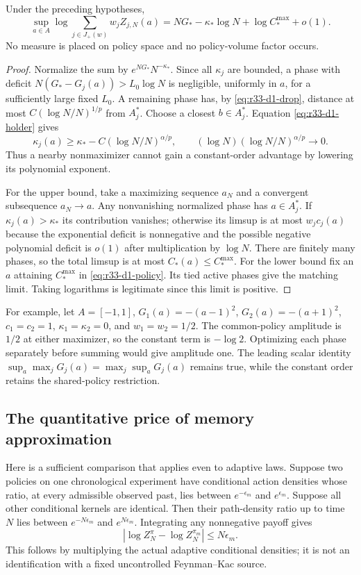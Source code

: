 \begin{theorem}
\label{thm:r33-d1-selection}
Under the preceding hypotheses,
\[
 \sup_{a\in A}\log\sum_{j\in J_+(w)}w_jZ_{j,N}(a)
 =NG_* -\kappa_*\log N+\log C_*^{\max}+o(1).
\]
No measure is placed on policy space and no policy-volume factor occurs.
\end{theorem}
\begin{proof}
Normalize the sum by $e^{NG_*}N^{-\kappa_*}$.  Since all $\kappa_j$ are
bounded, a phase with deficit $N(G_*-G_j(a))>L_0\log N$ is negligible,
uniformly in $a$, for a sufficiently large fixed $L_0$.
A remaining phase has, by \eqref{eq:r33-d1-drop}, distance at most
$C(\log N/N)^{1/p}$ from $A_j^*$.  Choose a closest $b\in A_j^*$.
Equation \eqref{eq:r33-d1-holder} gives
\[
 \kappa_j(a)\ge\kappa_*-
 C(\log N/N)^{\alpha/p},\qquad
 (\log N)(\log N/N)^{\alpha/p}\longrightarrow0.
\]
Thus a nearby nonmaximizer cannot gain a constant-order advantage by lowering
its polynomial exponent.

For the upper bound, take a maximizing sequence $a_N$ and a convergent
subsequence $a_N\to a$.  Any nonvanishing normalized phase has $a\in A_j^*$.
If $\kappa_j(a)>\kappa_*$ its contribution vanishes; otherwise its limsup
is at most $w_jc_j(a)$ because the exponential deficit is nonnegative and
the possible negative polynomial deficit is $o(1)$ after multiplication by
$\log N$.  There are finitely many phases, so the total limsup is at most
$C_*(a)\le C_*^{\max}$.
For the lower bound fix an $a$ attaining $C_*^{\max}$ in
\eqref{eq:r33-d1-policy}.  Its tied active phases give the matching limit.
Taking logarithms is legitimate since this limit is positive.
\end{proof}

For example, let $A=[-1,1]$, $G_1(a)=-(a-1)^2$,
$G_2(a)=-(a+1)^2$, $c_1=c_2=1$, $\kappa_1=\kappa_2=0$, and
$w_1=w_2=1/2$.  The common-policy amplitude is $1/2$ at either maximizer,
so the constant term is $-\log2$.  Optimizing each phase separately before
summing would give amplitude one.  The leading scalar identity
$\sup_a\max_jG_j(a)=\max_j\sup_aG_j(a)$ remains true, while the constant
order retains the shared-policy restriction.

\subsection{The quantitative price of memory approximation}

Here is a sufficient comparison that applies even to adaptive laws.
Suppose two policies on one chronological experiment have conditional action
densities whose ratio, at every admissible observed past, lies between
$e^{-\epsilon_m}$ and $e^{\epsilon_m}$.  Suppose all other conditional kernels
are identical.  Then their path-density ratio up to time $N$ lies between
$e^{-N\epsilon_m}$ and $e^{N\epsilon_m}$.  Integrating any nonnegative payoff
gives
\[
 |\log Z_N^{\pi}-\log Z_N^{\pi_m}|\le N\epsilon_m.
\]
This follows by multiplying the actual adaptive conditional densities; it is
not an identification with a fixed uncontrolled Feynman--Kac source.

